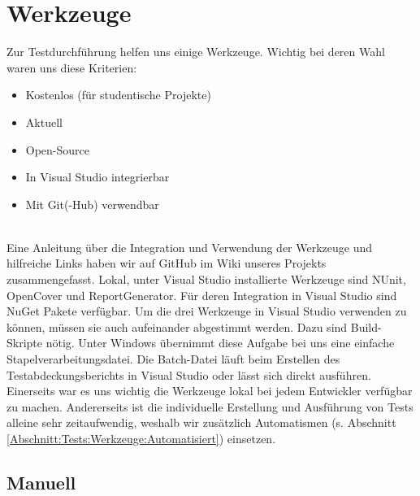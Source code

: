 %



\newpage



\section{Werkzeuge}
\label{Abschnitt:Tests:Werkzeuge}

Zur Testdurchführung helfen uns einige Werkzeuge. Wichtig bei deren Wahl waren uns diese Kriterien:\\

\begin{itemize}

	\item Kostenlos (für studentische Projekte)
	\item Aktuell
	\item Open-Source
	\item In Visual Studio integrierbar
	\item Mit Git(-Hub) verwendbar

\end{itemize}

~\\

Eine Anleitung über die Integration und Verwendung der Werkzeuge und hilfreiche Links haben wir auf GitHub im Wiki unseres Projekts zusammengefasst. Lokal, unter Visual Studio installierte Werkzeuge sind NUnit, OpenCover und ReportGenerator. Für deren Integration in Visual Studio sind NuGet Pakete verfügbar. Um die drei Werkzeuge in Visual Studio verwenden zu können, müssen sie auch aufeinander abgestimmt werden. Dazu sind  Build-Skripte nötig. Unter Windows übernimmt diese Aufgabe bei uns eine einfache Stapelverarbeitungsdatei. Die \glqq Batch\grqq-Datei läuft beim Erstellen des Testabdeckungsberichts in Visual Studio oder lässt sich direkt ausführen.\\

Einerseits war es uns wichtig die Werkzeuge lokal bei jedem Entwickler verfügbar zu machen. Andererseits ist die individuelle Erstellung und Ausführung von Tests alleine sehr zeitaufwendig, weshalb wir zusätzlich Automatismen (s. Abschnitt \ref{Abschnitt:Tests:Werkzeuge:Automatisiert}) einsetzen.
\\


\subsection{Manuell}
\label{Abschnitt:Programmfehler:Werkzeuge:Manuell}

